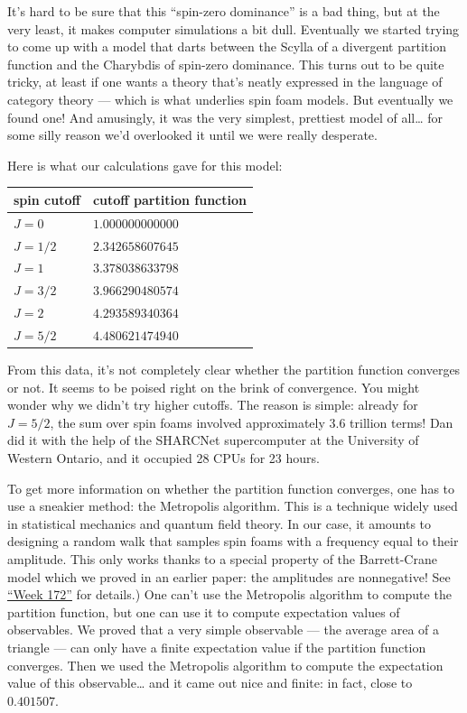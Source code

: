 \documentclass{article}
\begin{document}
It's hard to be sure that this ``spin-zero dominance'' is a bad thing,
but at the very least, it makes computer simulations a bit dull.
Eventually we started trying to come up with a model that darts between
the Scylla of a divergent partition function and the Charybdis of
spin-zero dominance. This turns out to be quite tricky, at least if one
wants a theory that's neatly expressed in the language of category
theory --- which is what underlies spin foam models. But eventually we
found one! And amusingly, it was the very simplest, prettiest model of
all\ldots{} for some silly reason we'd overlooked it until we were
really desperate.

Here is what our calculations gave for this model:

\begin{longtable}[]{@{}ll@{}}
\toprule
spin cutoff & cutoff partition function\tabularnewline
\midrule
\endhead
\(J = 0\) & \(1.000000000000\)\tabularnewline
\(J = 1/2\) & \(2.342658607645\)\tabularnewline
\(J = 1\) & \(3.378038633798\)\tabularnewline
\(J = 3/2\) & \(3.966290480574\)\tabularnewline
\(J = 2\) & \(4.293589340364\)\tabularnewline
\(J = 5/2\) & \(4.480621474940\)\tabularnewline
\bottomrule
\end{longtable}

From this data, it's not completely clear whether the partition function
converges or not. It seems to be poised right on the brink of
convergence. You might wonder why we didn't try higher cutoffs. The
reason is simple: already for \(J = 5/2\), the sum over spin foams
involved approximately 3.6 trillion terms! Dan did it with the help of
the SHARCNet supercomputer at the University of Western Ontario, and it
occupied 28 CPUs for 23 hours.

To get more information on whether the partition function converges, one
has to use a sneakier method: the Metropolis algorithm. This is a
technique widely used in statistical mechanics and quantum field theory.
In our case, it amounts to designing a random walk that samples spin
foams with a frequency equal to their amplitude. This only works thanks
to a special property of the Barrett-Crane model which we proved in an
earlier paper: the amplitudes are nonnegative! See
\protect\hyperlink{week172}{``Week 172''} for details.) One can't use
the Metropolis algorithm to compute the partition function, but one can
use it to compute expectation values of observables. We proved that a
very simple observable --- the average area of a triangle --- can only
have a finite expectation value if the partition function converges.
Then we used the Metropolis algorithm to compute the expectation value
of this observable\ldots{} and it came out nice and finite: in fact,
close to \(0.401507\).
\end{document}
